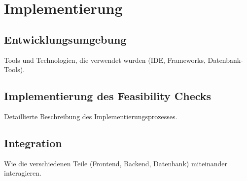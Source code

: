 \chapter{Implementierung}\label{Chap:Implementierung}
	
\section{Entwicklungsumgebung}
Tools und Technologien, die verwendet wurden (IDE, Frameworks, Datenbank-Tools).
\section{Implementierung des Feasibility Checks}
Detaillierte Beschreibung des Implementierungsprozesses.
\section{Integration}
Wie die verschiedenen Teile (Frontend, Backend, Datenbank) miteinander interagieren.